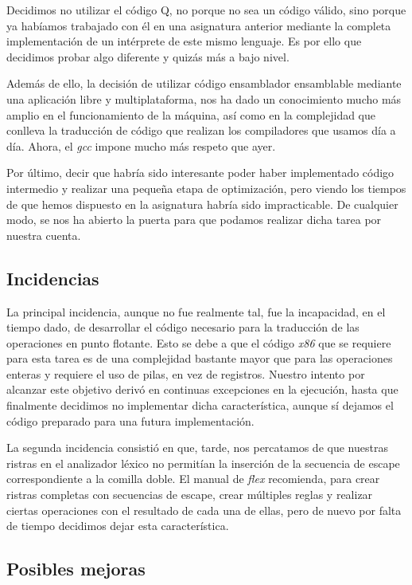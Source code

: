 \documentclass[a4paper,10pt]{article}
\begin{document}
Decidimos no utilizar el código Q, no porque no sea un código válido, sino porque ya habíamos trabajado con él en una asignatura anterior mediante la completa implementación de un intérprete de este mismo lenguaje. Es por ello que decidimos probar algo diferente y quizás más a bajo nivel.

Además de ello, la decisión de utilizar código ensamblador ensamblable mediante una aplicación libre y multiplataforma, nos ha dado un conocimiento mucho más amplio en el funcionamiento de la máquina, así como en la complejidad que conlleva la traducción de código que realizan los compiladores que usamos día a día. Ahora, el \textit{gcc} impone mucho más respeto que ayer.

Por último, decir que habría sido interesante poder haber implementado código intermedio y realizar una pequeña etapa de optimización, pero viendo los tiempos de que hemos dispuesto en la asignatura habría sido impracticable. De cualquier modo, se nos ha abierto la puerta para que podamos realizar dicha tarea por nuestra cuenta.

\subsection{Incidencias}

La principal incidencia, aunque no fue realmente tal, fue la incapacidad, en el tiempo dado, de desarrollar el código necesario para la traducción de las operaciones en punto flotante. Esto se debe a que el código \textit{x86} que se requiere para esta tarea es de una complejidad bastante mayor que para las operaciones enteras y requiere el uso de pilas, en vez de registros. Nuestro intento por alcanzar este objetivo derivó en continuas excepciones en la ejecución, hasta que finalmente decidimos no implementar dicha característica, aunque sí dejamos el código preparado para una futura implementación.

La segunda incidencia consistió en que, tarde, nos percatamos de que nuestras ristras en el analizador léxico no permitían la inserción de la secuencia de escape correspondiente a la comilla doble. El manual de \textit{flex} recomienda, para crear ristras completas con secuencias de escape, crear múltiples reglas y realizar ciertas operaciones con el resultado de cada una de ellas, pero de nuevo por falta de tiempo decidimos dejar esta característica.


\subsection{Posibles mejoras}
\end{document}
